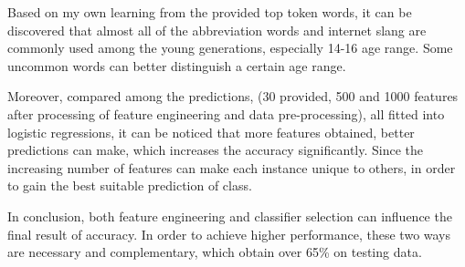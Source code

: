 \documentclass[11pt]{article}
\begin{document}
Based on my own learning from the provided top token words, it can be discovered that almost all of the abbreviation words and internet slang are commonly used among the young generations, especially 14-16 age range. Some uncommon words can better distinguish a certain age range.

Moreover, compared among the predictions, (30 provided, 500 and 1000 features after processing of feature engineering and data pre-processing), all fitted into logistic regressions, it can be noticed that more features obtained, better predictions can make, which increases the accuracy significantly. Since the increasing number of features can make each instance unique to others, in order to gain the best suitable prediction of class.

In conclusion, both feature engineering and classifier selection can influence the final result of accuracy. In order to achieve higher performance, these two ways are necessary and complementary, which obtain over 65\% on testing data.



\end{document}
